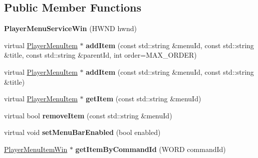 \subsection*{Public Member Functions}
\begin{DoxyCompactItemize}
\item 
\mbox{\label{classPlayerMenuServiceWin_a842550db1a6913e0d82d2cb59dad130e}} 
{\bfseries Player\+Menu\+Service\+Win} (H\+W\+ND hwnd)
\item 
\mbox{\label{classPlayerMenuServiceWin_afb5e7b923fc24196d92729d8da737502}} 
virtual \hyperlink{classPlayerMenuItem}{Player\+Menu\+Item} $\ast$ {\bfseries add\+Item} (const std\+::string \&menu\+Id, const std\+::string \&title, const std\+::string \&parent\+Id, int order=M\+A\+X\+\_\+\+O\+R\+D\+ER)
\item 
\mbox{\label{classPlayerMenuServiceWin_a4bce35633a57a1c94c981213c4cc8b58}} 
virtual \hyperlink{classPlayerMenuItem}{Player\+Menu\+Item} $\ast$ {\bfseries add\+Item} (const std\+::string \&menu\+Id, const std\+::string \&title)
\item 
\mbox{\label{classPlayerMenuServiceWin_abaa329c6ac530851de350c3559e3f783}} 
virtual \hyperlink{classPlayerMenuItem}{Player\+Menu\+Item} $\ast$ {\bfseries get\+Item} (const std\+::string \&menu\+Id)
\item 
\mbox{\label{classPlayerMenuServiceWin_a19aed4d0a3735a1076f02009048b3884}} 
virtual bool {\bfseries remove\+Item} (const std\+::string \&menu\+Id)
\item 
\mbox{\label{classPlayerMenuServiceWin_a390518d5d5e814d3b6bda5b514de12a9}} 
virtual void {\bfseries set\+Menu\+Bar\+Enabled} (bool enabled)
\item 
\mbox{\label{classPlayerMenuServiceWin_a8cdd00f5ed348533e243c3d7e8a3a8e4}} 
\hyperlink{classPlayerMenuItemWin}{Player\+Menu\+Item\+Win} $\ast$ {\bfseries get\+Item\+By\+Command\+Id} (W\+O\+RD command\+Id)
\item 
\mbox{\label{classPlayerMenuServiceWin_a842550db1a6913e0d82d2cb59dad130e}} 

\end{DoxyCompactItemize}
